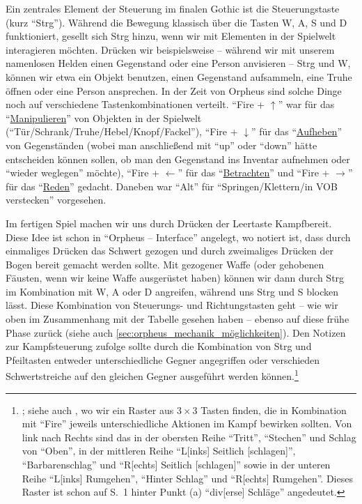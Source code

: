\documentclass[a5paper,pagesize,numbers=noenddot]{scrbook}
\begin{document}
Ein zentrales Element der Steuerung im finalen Gothic ist die Steuerungstaste (kurz \enquote{Strg}).
Während die Bewegung klassisch über die Tasten W, A, S und D funktioniert, gesellt sich Strg hinzu, wenn wir mit Elementen in der Spielwelt interagieren möchten.
Drücken wir beispielsweise -- während wir mit unserem namenlosen Helden einen Gegenstand oder eine Person anvisieren -- Strg und W, können wir etwa ein Objekt benutzen, einen Gegenstand aufsammeln, eine Truhe öffnen oder eine Person ansprechen.
In der Zeit von Orpheus sind solche Dinge noch auf verschiedene Tastenkombinationen verteilt.
\enquote{Fire + $\uparrow$} war für das \enquote{\uline{Manipulieren}} von Objekten in der Spielwelt (\enquote{Tür/Schrank/Truhe/Hebel/Knopf/Fackel}), \enquote{Fire + $\downarrow$} für das \enquote{\uline{Aufheben}} von Gegenständen (wobei man anschließend mit \enquote{up} oder \enquote{down} hätte entscheiden können sollen, ob man den Gegenstand ins Inventar aufnehmen oder \enquote{wieder weglegen} möchte), \enquote{Fire + $\leftarrow$} für das \enquote{\uline{Betrachten}} und \enquote{Fire + $\rightarrow$} für das \enquote{\uline{Reden}} gedacht.\autocite[S.~2]{orpheus_interface}
Daneben war \enquote{Alt} für \enquote{Springen/Klettern/in VOB verstecken} vorgesehen.\autocite[S.~3]{orpheus_interface}

Im fertigen Spiel machen wir uns durch Drücken der Leertaste Kampfbereit.
Diese Idee ist schon in \enquote{Orpheus -- Interface} angelegt, wo notiert ist, dass durch einmaliges Drücken das Schwert gezogen und durch zweimaliges Drücken der Bogen bereit gemacht werden sollte.\autocite[S.~2]{orpheus_interface}
Mit gezogener Waffe (oder gehobenen Fäusten, wenn wir keine Waffe ausgerüstet haben) können wir dann durch Strg im Kombination mit W, A oder D angreifen, während uns Strg und S blocken lässt.
Diese Kombination von Steuerungs- und Richtungstasten geht -- wie wir oben im Zusammenhang mit der Tabelle gesehen haben -- ebenso auf diese frühe Phase zurück (siehe auch \autoref{sec:orpheus_mechanik_möglichkeiten}).
Den Notizen zur Kampfsteuerung zufolge sollte durch die Kombination von Strg und Pfeiltasten entweder unterschiedliche Gegner angegriffen oder verschieden Schwertstreiche auf den gleichen Gegner ausgeführt werden können.\footnote{\autocite[Vgl.][S.~1--3]{orpheus_kampfsteuerung}; siehe auch \autocite[S.~4]{orpheus_interface}, wo wir ein Raster aus $3 \times 3$ Tasten finden, die in Kombination mit \enquote{Fire} jeweils unterschiedliche Aktionen im Kampf bewirken sollten. Von link nach Rechts sind das in der obersten Reihe \enquote{Tritt}, \enquote{Stechen} und Schlag von \enquote{Oben}, in der mittleren Reihe \enquote{L[inks] Seitlich [schlagen]}, \enquote{Barbarenschlag} und \enquote{R[echts] Seitlich [schlagen]} sowie in der unteren Reihe \enquote{L[inks] Rumgehen}, \enquote{Hinter Schlag} und \enquote{R[echts] Rumgehen}. Dieses Raster ist schon auf S.~1 hinter Punkt (a) \enquote{div[erse] Schläge} angedeutet.}
\end{document}
